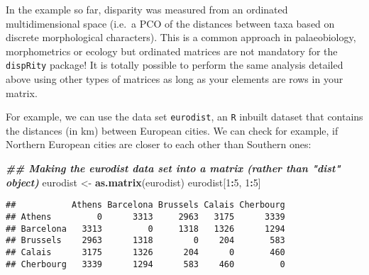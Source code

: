 \documentclass[
]{book}
\newenvironment{Shaded}{\begin{snugshade}}{\end{snugshade}}
\newcommand{\DecValTok}[1]{\textcolor[rgb]{0.00,0.00,0.81}{#1}}
\newcommand{\DocumentationTok}[1]{\textcolor[rgb]{0.56,0.35,0.01}{\textbf{\textit{#1}}}}
\newcommand{\FunctionTok}[1]{\textcolor[rgb]{0.13,0.29,0.53}{\textbf{#1}}}
\newcommand{\NormalTok}[1]{#1}
\newcommand{\OtherTok}[1]{\textcolor[rgb]{0.56,0.35,0.01}{#1}}
\newcommand{\SpecialCharTok}[1]{\textcolor[rgb]{0.81,0.36,0.00}{\textbf{#1}}}
\begin{document}
In the example so far, disparity was measured from an ordinated multidimensional space (i.e.~a PCO of the distances between taxa based on discrete morphological characters).
This is a common approach in palaeobiology, morphometrics or ecology but ordinated matrices are not mandatory for the \texttt{dispRity} package!
It is totally possible to perform the same analysis detailed above using other types of matrices as long as your elements are rows in your matrix.

For example, we can use the data set \texttt{eurodist}, an \texttt{R} inbuilt dataset that contains the distances (in km) between European cities.
We can check for example, if Northern European cities are closer to each other than Southern ones:

\begin{Shaded}
\begin{Highlighting}[]
\DocumentationTok{\#\# Making the eurodist data set into a matrix (rather than "dist" object)}
\NormalTok{eurodist }\OtherTok{\textless{}{-}} \FunctionTok{as.matrix}\NormalTok{(eurodist)}
\NormalTok{eurodist[}\DecValTok{1}\SpecialCharTok{:}\DecValTok{5}\NormalTok{, }\DecValTok{1}\SpecialCharTok{:}\DecValTok{5}\NormalTok{]}
\end{Highlighting}
\end{Shaded}

\begin{verbatim}
##           Athens Barcelona Brussels Calais Cherbourg
## Athens         0      3313     2963   3175      3339
## Barcelona   3313         0     1318   1326      1294
## Brussels    2963      1318        0    204       583
## Calais      3175      1326      204      0       460
## Cherbourg   3339      1294      583    460         0
\end{verbatim}
\end{document}
